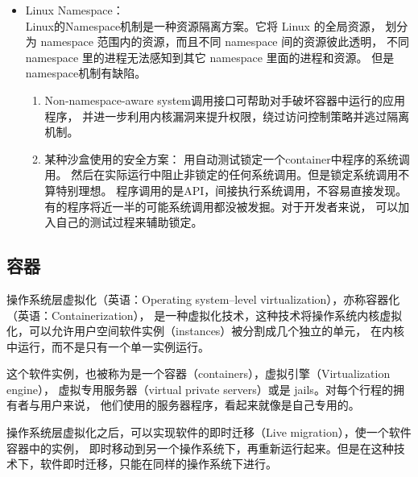 \documentclass[AutoFakeBold,a4paper]{ctexart}
\begin{document}
\begin{itemize}
    \item Linux Namespace：\\
    Linux的Namespace机制是一种资源隔离方案。它将 Linux 的全局资源，
    划分为 namespace 范围内的资源，而且不同 namespace 间的资源彼此透明，
    不同 namespace 里的进程无法感知到其它 namespace 里面的进程和资源。
    但是namespace机制有缺陷。
    \begin{enumerate}
        \item Non-namespace-aware system调用接口可帮助对手破坏容器中运行的应用程序，
        并进一步利用内核漏洞来提升权限，绕过访问控制策略并逃过隔离机制。\cite{2019Practical}
        \item 某种沙盒使用的安全方案\cite{2019Practical}：
        用自动测试锁定一个container中程序的系统调用。
        然后在实际运行中阻止非锁定的任何系统调用。但是锁定系统调用不算特别理想。
        程序调用的是API，间接执行系统调用，不容易直接发现。
        有的程序将近一半的可能系统调用都没被发掘。对于开发者来说，
        可以加入自己的测试过程来辅助锁定。
    \end{enumerate}

\end{itemize}






\subsection{容器}
操作系统层虚拟化（英语：Operating system–level virtualization），亦称容器化（英语：Containerization），
是一种虚拟化技术，这种技术将操作系统内核虚拟化，可以允许用户空间软件实例（instances）被分割成几个独立的单元，
在内核中运行，而不是只有一个单一实例运行。

这个软件实例，也被称为是一个容器（containers），虚拟引擎（Virtualization engine），
虚拟专用服务器（virtual private servers）或是 jails。对每个行程的拥有者与用户来说，
他们使用的服务器程序，看起来就像是自己专用的。

操作系统层虚拟化之后，可以实现软件的即时迁移（Live migration），使一个软件容器中的实例，
即时移动到另一个操作系统下，再重新运行起来。但是在这种技术下，软件即时迁移，只能在同样的操作系统下进行。
\end{document}

